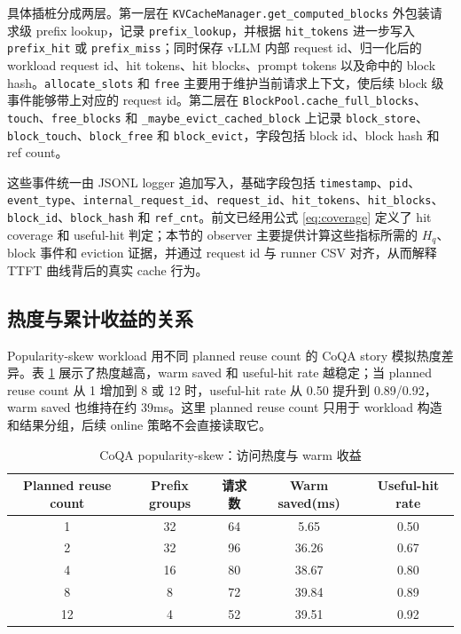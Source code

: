 \documentclass[UTF8,a4paper,10pt]{ctexart}
\begin{document}
具体插桩分成两层。第一层在 \texttt{KVCacheManager.get\_computed\_blocks} 外包装请求级 prefix lookup，记录 \texttt{prefix\_lookup}，并根据 \texttt{hit\_tokens} 进一步写入 \texttt{prefix\_hit} 或 \texttt{prefix\_miss}；同时保存 vLLM 内部 request id、归一化后的 workload request id、hit tokens、hit blocks、prompt tokens 以及命中的 block hash。\texttt{allocate\_slots} 和 \texttt{free} 主要用于维护当前请求上下文，使后续 block 级事件能够带上对应的 request id。第二层在 \texttt{BlockPool.cache\_full\_blocks}、\texttt{touch}、\texttt{free\_blocks} 和 \texttt{\_maybe\_evict\_cached\_block} 上记录 \texttt{block\_store}、\texttt{block\_touch}、\texttt{block\_free} 和 \texttt{block\_evict}，字段包括 block id、block hash 和 ref count。

这些事件统一由 JSONL logger 追加写入，基础字段包括 \texttt{timestamp}、\texttt{pid}、\texttt{event\_type}、\texttt{internal\_request\_id}、\texttt{request\_id}、\texttt{hit\_tokens}、\texttt{hit\_blocks}、\texttt{block\_id}、\texttt{block\_hash} 和 \texttt{ref\_cnt}。前文已经用公式 \ref{eq:coverage} 定义了 hit coverage 和 useful-hit 判定；本节的 observer 主要提供计算这些指标所需的 $H_q$、block 事件和 eviction 证据，并通过 request id 与 runner CSV 对齐，从而解释 TTFT 曲线背后的真实 cache 行为。

\subsection{热度与累计收益的关系}

Popularity-skew workload 用不同 planned reuse count 的 CoQA story 模拟热度差异。表 \ref{tab:popularity} 展示了热度越高，warm saved 和 useful-hit rate 越稳定；当 planned reuse count 从 1 增加到 8 或 12 时，useful-hit rate 从 0.50 提升到 0.89/0.92，warm saved 也维持在约 39ms。这里 planned reuse count 只用于 workload 构造和结果分组，后续 online 策略不会直接读取它。

\begin{table}[H]
\centering
\small
\caption{CoQA popularity-skew：访问热度与 warm 收益}
\label{tab:popularity}
\begin{tabular}{ccccc}
\toprule
Planned reuse count & Prefix groups & 请求数 & Warm saved(ms) & Useful-hit rate \\
\midrule
1  & 32 & 64 & 5.65  & 0.50 \\
2  & 32 & 96 & 36.26 & 0.67 \\
4  & 16 & 80 & 38.67 & 0.80 \\
8  & 8  & 72 & 39.84 & 0.89 \\
12 & 4  & 52 & 39.51 & 0.92 \\
\bottomrule
\end{tabular}
\end{table}
\end{document}
